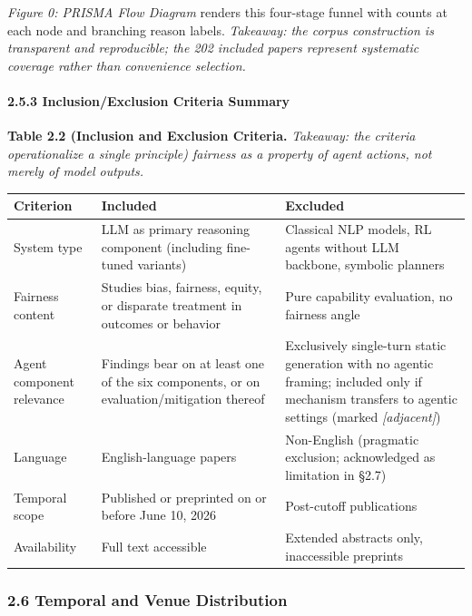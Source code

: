 \documentclass[10pt]{article}
\begin{document}
\emph{Figure 0: PRISMA Flow Diagram} renders this four-stage funnel with counts at each node and branching reason labels. \emph{Takeaway: the corpus construction is transparent and reproducible; the 202 included papers represent systematic coverage rather than convenience selection.}

\paragraph*{2.5.3 Inclusion/Exclusion Criteria Summary}

\textbf{Table 2.2 (Inclusion and Exclusion Criteria.} \emph{Takeaway: the criteria operationalize a single principle) fairness as a property of agent actions, not merely of model outputs.}

\begin{center}\footnotesize
\begin{longtable}{|p{}|p{}|p{}|}
\hline \textbf{Criterion} & \textbf{Included} & \textbf{Excluded} \\ \hline\endhead
System type & LLM as primary reasoning component (including fine-tuned variants) & Classical NLP models, RL agents without LLM backbone, symbolic planners \\ \hline
Fairness content & Studies bias, fairness, equity, or disparate treatment in outcomes or behavior & Pure capability evaluation, no fairness angle \\ \hline
Agent component relevance & Findings bear on at least one of the six components, or on evaluation/mitigation thereof & Exclusively single-turn static generation with no agentic framing; included only if mechanism transfers to agentic settings (marked \emph{[adjacent]}) \\ \hline
Language & English-language papers & Non-English (pragmatic exclusion; acknowledged as limitation in \S{}2.7) \\ \hline
Temporal scope & Published or preprinted on or before June 10, 2026 & Post-cutoff publications \\ \hline
Availability & Full text accessible & Extended abstracts only, inaccessible preprints \\ \hline
\end{longtable}\end{center}


\subsubsection*{2.6 Temporal and Venue Distribution}
\end{document}
